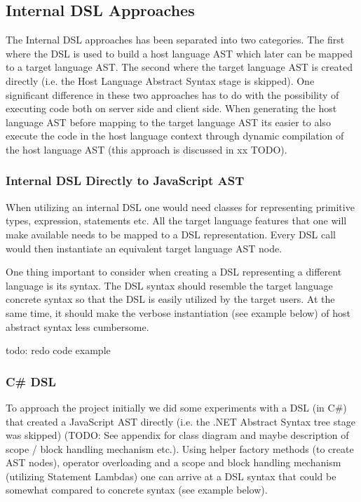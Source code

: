 	\subsection{Internal DSL Approaches} %
	\label{ssub:internal_dsl_approaches}

		The Internal DSL approaches has been separated into two categories. The first where the DSL is used to build a host language AST which later can be mapped to a target language AST. The second where the target language AST is created directly (i.e. the Host Language Abstract Syntax stage is skipped). One significant difference in these two approaches has to do with the possibility of executing code both on server side and client side. When generating the host language AST before mapping to the target language AST its easier to also execute the code in the host language context through dynamic compilation of the host language AST (this approach is discussed in xx TODO).
	
		\subsubsection{Internal DSL Directly to JavaScript AST} %
		\label{sub:internal_dsl_directly_to_javascript_ast}
		
			When utilizing an internal DSL one would need classes for representing primitive types, expression, statements etc. All the target language features that one will make available needs to be mapped to a DSL representation. Every DSL call would then instantiate an equivalent target language AST node.

			One thing important to consider when creating a DSL representing a different language is its syntax. The DSL syntax should resemble the target language concrete syntax so that the DSL is easily utilized by the target users. At the same time, it should make the verbose instantiation (see example below) of host abstract syntax less cumbersome.

			todo: redo code example


		\subsubsection{C\# DSL} %
		\label{sub:cs_dsl}

			To approach the project initially we did some experiments with a DSL (in C\#) that created a JavaScript AST directly (i.e. the .NET Abstract Syntax tree stage was skipped) (TODO: See appendix for class diagram and maybe description of scope / block handling mechanism etc.). Using helper factory methods (to create AST nodes), operator overloading and a scope and block handling mechanism (utilizing Statement Lambdas) one can arrive at a DSL syntax that could be somewhat compared to concrete syntax (see example below).


